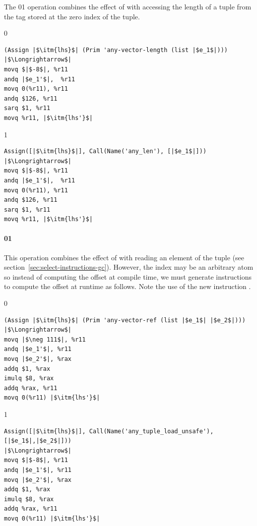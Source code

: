 \documentclass[7x10]{TimesAPriori_MIT}%
\def\racketEd{0}
\def\pythonEd{1}
\def\edition{0}
\newcommand{\racket}[1]{{\if\edition\racketEd{#1}\fi}}
\newcommand{\python}[1]{{\if\edition\pythonEd #1\fi}}
\numberwithin{theorem}{chapter}
\numberwithin{definition}{chapter}
\numberwithin{equation}{chapter}
\begin{document}
The \racket{}\python{}
operation combines the effect of  with accessing the
length of a tuple from the tag stored at the zero index of the tuple.

{\if\edition\racketEd
\begin{lstlisting}
(Assign |$\itm{lhs}$| (Prim 'any-vector-length (list |$e_1$|)))
|$\Longrightarrow$|
movq $|$-8$|, %r11
andq |$e_1'$|,  %r11
movq 0(%r11), %r11
andq $126, %r11
sarq $1, %r11
movq %r11, |$\itm{lhs'}$|
\end{lstlisting}
\fi}
{\if\edition\pythonEd
\begin{lstlisting}
Assign([|$\itm{lhs}$|], Call(Name('any_len'), [|$e_1$|]))
|$\Longrightarrow$|
movq $|$-8$|, %r11
andq |$e_1'$|,  %r11
movq 0(%r11), %r11
andq $126, %r11
sarq $1, %r11
movq %r11, |$\itm{lhs'}$|
\end{lstlisting}
\fi}

\paragraph{\racket{}\python{}}

This operation combines the effect of  with reading an
element of the tuple (see
section~\ref{sec:select-instructions-gc}). However, the index may be
an arbitrary atom so instead of computing the offset at compile time,
we must generate instructions to compute the offset at runtime as
follows. Note the use of the new instruction .
\begin{center}
\begin{minipage}{0.96\textwidth}
{\if\edition\racketEd    
\begin{lstlisting}
(Assign |$\itm{lhs}$| (Prim 'any-vector-ref (list |$e_1$| |$e_2$|)))
|$\Longrightarrow$|
movq |$\neg 111$|, %r11
andq |$e_1'$|, %r11
movq |$e_2'$|, %rax
addq $1, %rax
imulq $8, %rax
addq %rax, %r11
movq 0(%r11) |$\itm{lhs'}$|
\end{lstlisting}
\fi}
%
{\if\edition\pythonEd    
\begin{lstlisting}
Assign([|$\itm{lhs}$|], Call(Name('any_tuple_load_unsafe'), [|$e_1$|,|$e_2$|]))
|$\Longrightarrow$|
movq $|$-8$|, %r11
andq |$e_1'$|, %r11
movq |$e_2'$|, %rax
addq $1, %rax
imulq $8, %rax
addq %rax, %r11
movq 0(%r11) |$\itm{lhs'}$|
\end{lstlisting}
\fi}
\end{minipage}
\end{center}
\end{document}
